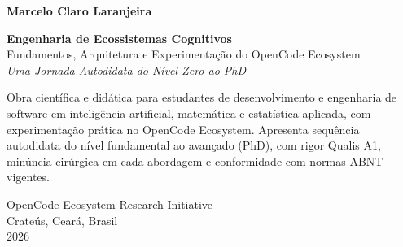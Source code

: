 \begin{folhaderosto}
    \centering
    
    {\large\bfseries Marcelo Claro Laranjeira}\par
    
    \vspace{2cm}
    
    {\Huge\bfseries\color{blue!60!black} Engenharia de Ecossistemas Cognitivos}\\[0.3cm]
    {\large Fundamentos, Arquitetura e Experimentação do OpenCode Ecosystem}\\[0.6cm]
    {\large\itshape Uma Jornada Autodidata do Nível Zero ao PhD}\par
    
    \vspace{1.5cm}
    
    \hfill
    \begin{minipage}{0.45\textwidth}
    \small
    Obra científica e didática para estudantes de desenvolvimento 
    e engenharia de software em inteligência artificial, matemática 
    e estatística aplicada, com experimentação prática no OpenCode 
    Ecosystem. Apresenta sequência autodidata do nível fundamental 
    ao avançado (PhD), com rigor Qualis A1, minúncia cirúrgica em 
    cada abordagem e conformidade com normas ABNT vigentes.
    \end{minipage}
    \par
    
    \vspace{1.5cm}
    
    \begin{flushright}
    {\small OpenCode Ecosystem Research Initiative}\\[0.1cm]
    {\small Crateús, Ceará, Brasil}\\[0.1cm]
    {\small 2026}
    \end{flushright}
    
    \vspace*{\fill}
\end{folhaderosto}
